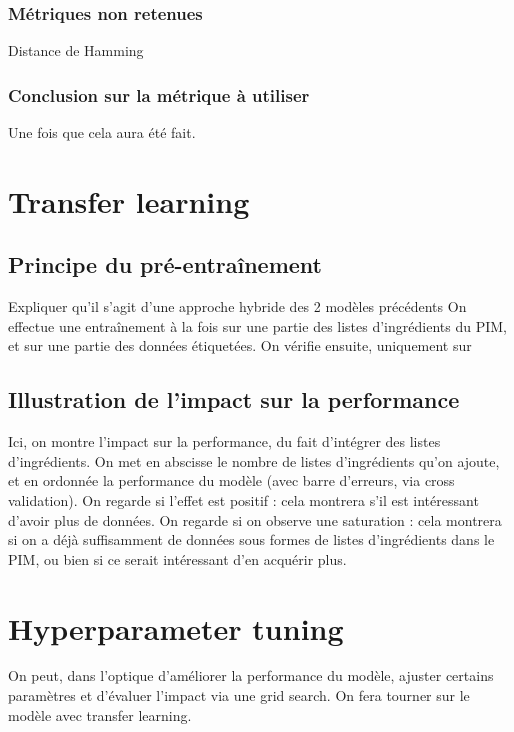             \subsection{Métriques non retenues}
            Distance de Hamming

            \subsection{Conclusion sur la métrique à utiliser}
            Une fois que cela aura été fait.

    \chapter{Transfer learning}
        
        \section{Principe du pré-entraînement}
        
        Expliquer qu'il s'agit d'une approche hybride des 2 modèles précédents
        On effectue une entraînement à la fois sur une partie des listes d'ingrédients du PIM, et sur une partie des données étiquetées.
        On vérifie ensuite, uniquement sur 

        \section{Illustration de l'impact sur la performance}

        Ici, on montre l'impact sur la performance, du fait d'intégrer des listes d'ingrédients.
        On met en abscisse le nombre de listes d'ingrédients qu'on ajoute, et en ordonnée la performance du modèle (avec barre d'erreurs, via cross validation).
        On regarde si l'effet est positif : cela montrera s'il est intéressant d'avoir plus de données.
        On regarde si on observe une saturation : cela montrera si on a déjà suffisamment de données sous formes de listes d'ingrédients dans le PIM, ou bien si ce serait intéressant d'en acquérir plus.

    \chapter{Hyperparameter tuning}
            
    On peut, dans l'optique d'améliorer la performance du modèle, ajuster certains paramètres et d'évaluer l'impact via une grid search.
    On fera tourner sur le modèle avec transfer learning.

